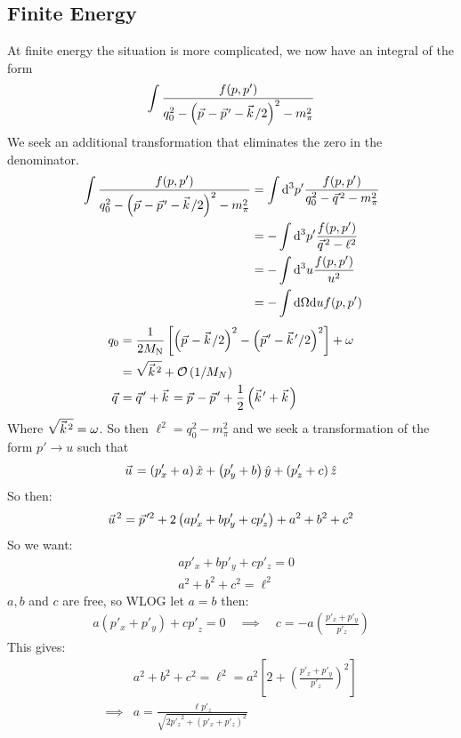 \documentclass[11pt]{article}
\newcommand{\vectorwithspace}[1]{\vec{#1}\mkern2mu\vphantom{#1}}
\newcommand{\kv}{\vectorwithspace{k}}
\newcommand{\pv}{\vectorwithspace{p}}
\newcommand{\qv}{\vectorwithspace{q}}
\newcommand{\uv}{\vectorwithspace{u}}
\newcommand{\mpi}{\ensuremath{m_\pi}}
\newcommand{\dd}{\mathrm{d}}
\newcommand{\MN}{\ensuremath{M_\mathrm{N}}} %
\newcommand{\ppv}{{\pv'}}
\newcommand{\pp}{{p'}}
\newcommand{\ppx}{{p'_x}}
\newcommand{\ppy}{{p'_y}}
\newcommand{\ppz}{{p'_z}}
\begin{document}
\subsection{Finite Energy}
At finite energy the situation is more complicated, we now have an integral of the form
\begin{equation}
	\int \frac{f(p,\pp)}{q_0^2- \left( \pv-\ppv-\kv/2 \right)^2 -\mpi^2	}
\end{equation}
We seek an additional transformation that eliminates the zero in the denominator.
\begin{align}
	\int \frac{f(p,\pp)}{q_0^2- \left( \pv-\ppv-\kv/2 \right)^2 -\mpi^2	} & =
	\int \dd^3 \pp \frac{f(p,\pp)}{q_0^2- \qv^2-m_\pi^2}\\
	 & =- \int \dd^3 \pp \frac{f(p,\pp)}{\qv^2 -\ell^2}\\
	 &= - \int \dd^3 u \frac{f(p,\pp)}{u^2} \\
	&= -\int \dd \Omega \dd u f(p,\pp)
\end{align}
\begin{align}
	q_0& =\frac{1}{2\MN}\left[ \left( \pv - \kv/2 \right)^2- \left( \pv' -\kv'/2 \right)^2\right]+\omega \\
	&= \sqrt{\kv^2} + \mathcal{O}  \left(1/M_N \right) \\
	\qv& =\qv'+\kv=\pv-\pv' + \frac{1}{2} \left( \kv'+\kv \right)
\end{align}
Where $\sqrt{\kv^2}=\omega$.
So then $\ell^2=q_0^2-m_\pi^2$ and we seek a transformation of the form $\pp \to u$ such that
\begin{equation}
	\uv=\left(\ppx+a \right)\hat{x}+
	\left(\ppy+b \right)\hat{y}+
	\left(\ppz+c \right)\hat{z}
\end{equation}
So then:
\begin{equation}
	\uv^2=\pv^{\prime 2}+ 2 \left( a \ppx+b \ppy + c \ppz\right)+a^2+b^2+c^2
\end{equation}
So we want:
\begin{align}
	 & a \ppx+b \ppy + c \ppz=0\\
	 & a^2+b^2+c^2=\ell^2
\end{align}
$a,b$ and $c$ are free, so WLOG let $a=b$ then:
\begin{align}
	a(\ppx+\ppy)+c \pp_z=0\quad\implies\quad c=-a \left( \frac{\ppx+\ppy}{\ppz}  \right)
\end{align}
This gives:
\begin{align}
	&a^2+b^2+c^2=\ell^2=a^2\left[2 +\left( \frac{\ppx+\ppy}{\ppz}\right)^2\right]\\
	\implies & a= \frac{\ell\ppz}{\sqrt{2\ppz^2 +(\ppx+\ppz)^2}} 
\end{align}
\end{document}
